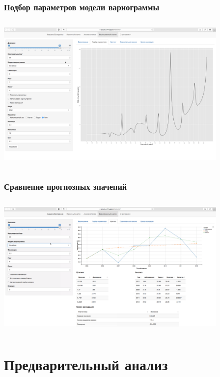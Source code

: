 \documentclass[10pt, pdf,aspectratio=169]{beamer}
\begin{document}
\begin{frame}
  \frametitle{Подбор параметров модели вариограммы}   %
   \begin{columns}[c]
   \column{4.5in}
  \includegraphics[width=4.5in]{../../figures/static/5_fit.png}
  \end{columns}
\end{frame}

\begin{frame}
  \frametitle{Сравнение прогнозных значений}   %
   \begin{columns}[c]
   \column{4.5in}
  \includegraphics[width=4.5in]{../../figures/static/6_krige.png}
  \end{columns}
\end{frame}

\section{Предварительный анализ}
\end{document}
